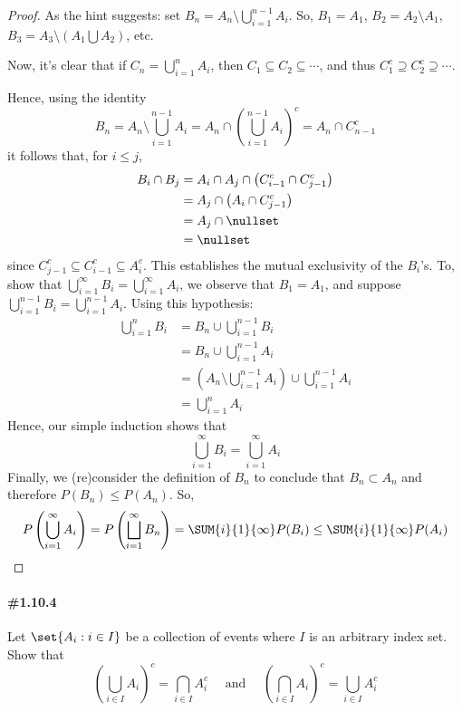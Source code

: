 \documentclass[12pt,titlepage]{article}
\begin{document}
\begin{proof}
As the hint suggests: set $B_n = A_n \setminus \bigcup_{i=1}^{n-1} A_i $. So, $B_1 = A_1$, $B_2 = A_2 \setminus A_1$, $B_3 = A_3 \setminus (A_1 \bigcup A_2)$, etc. 

Now, it's clear that if $C_n = \bigcup_{i=1}^{n} A_i$, then $C_1 \subseteq C_2 \subseteq \cdots$, and thus $C_{1}^{c} \supseteq C_{2}^{c} \supseteq \cdots$. 

Hence, using the identity 
\[
B_n = A_n \setminus \bigcup_{i=1}^{n-1}A_i = A_n \cap \left( \bigcup_{i=1}^{n-1} A_i \right)^{c} = A_n \cap C_{n-1}^{c}
\]
it follows that, for $i \leq j$,
\begin{align*}
B_i \cap B_j &= A_i \cap A_j \cap \left( C_{i-1}^{c} \cap C_{j-1}^{c}\right) \\
&= A_j \cap \left(A_i \cap C_{j-1}^{c} \right) \\
&= A_j \cap \nullset \\
&= \nullset
\end{align*}
since $C_{j-1}^{c} \subseteq C_{i-1}^{c} \subseteq A_{i}^{c}$. This establishes the mutual exclusivity of the $B_i$'s. To, show that $\bigcup_{i=1}^{\infty} B_i = \bigcup_{i=1}^{\infty} A_i$, we observe that $B_1 = A_1$, and suppose $\bigcup_{i=1}^{n-1} B_i = \bigcup_{i=1}^{n-1} A_i$. Using this hypothesis:
\begin{align*}
\bigcup_{i=1}^{n} B_i &= B_n \cup \bigcup_{i=1}^{n-1} B_i \\
&= B_n \cup \bigcup_{i=1}^{n-1} A_i \\
&= \left( A_n \setminus \bigcup_{i=1}^{n-1} A_i \right) \cup \bigcup_{i=1}^{n-1} A_i \\
&= \bigcup_{i=1}^{n} A_i
\end{align*}
Hence, our simple induction shows that 
\[
\bigcup_{i=1}^{\infty} B_i = \bigcup_{i=1}^{\infty} A_i
\]
Finally, we (re)consider the definition of $B_n$ to conclude that $B_n \subset A_n$ and therefore $P(B_n) \leq P(A_n)$. So, 
\[
P\left( \bigcup_{i=1}^{\infty} A_i \right) = P\left( \bigsqcup_{i=1}^{\infty} B_n \right) = \SUM{i}{1}{\infty} P(B_i) \leq \SUM{i}{1}{\infty} P(A_i)
\]
\end{proof}

\paragraph{\#1.10.4} Let $\set{A_i : i \in I}$ be a collection of events where $I$ is an arbitrary index set. Show that
\[
\left( \bigcup_{i \in I} A_i \right)^{c} = \bigcap_{i\in I} A_{i}^{c} \quad \text{ and } \quad \left( \bigcap_{i\in I}  A_i \right)^{c} = \bigcup_{i \in I} A_{i}^{c}
\]
\end{document}
